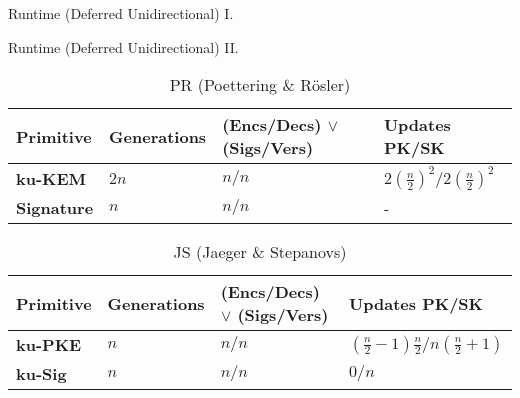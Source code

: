 \documentclass{beamer}
\begin{document}
\begin{frame}{Runtime (Deferred Unidirectional) I.}
 \begin{figure}[H]
    \centering
     
  \end{figure}
\end{frame}

\begin{frame}{Runtime (Deferred Unidirectional) II.}
  \scriptsize
  \begin{table}
    \caption*{PR (Poettering \& Rösler)}
    \begin{tabular}{ | l | l | l | l |}
    \hline
    Primitive & Generations & (Encs/Decs) $\vee$ (Sigs/Vers) & Updates PK/SK \\ \hline
    \textbf{ku-KEM} & $2n$ & $n/n$ & $2(\frac{n}{2})^2/2(\frac{n}{2})^2$ \\ \hline
    \textbf{Signature} & $n$ & $n/n$ & - \\  
    \hline
    \end{tabular}
  \end{table}
  \begin{table}
    \caption*{JS (Jaeger \& Stepanovs)}
    \begin{tabular}{ | l | l | l | l |}
    \hline
    Primitive & Generations & (Encs/Decs) $\vee$ (Sigs/Vers) & Updates PK/SK \\ \hline
    \textbf{ku-PKE} & $n$ & $n/n$ & $(\frac{n}{2}-1)\frac{n}{2}/n(\frac{n}{2}+1)$ \\ \hline
    \textbf{ku-Sig} & $n$ & $n/n$ & $0/n$ \\  
    \hline
    \end{tabular}
  \end{table}
\end{frame}
\end{document}
